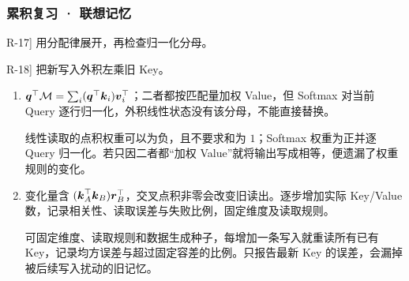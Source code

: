 \subsubsection*{累积复习 · 联想记忆}
\begin{answerhints}
\item[\hyperref[exercise:review-memory-pipeline]{R-17}] \leavevmode{}\label{hint:review-memory-pipeline}用分配律展开，再检查归一化分母。
\item[\hyperref[exercise:review-memory-correction]{R-18}] \leavevmode{}\label{hint:review-memory-correction}把新写入外积左乘旧 Key。
\end{answerhints}
\begin{enumerate}[label={},leftmargin=4.8em,itemsep=4pt]
\item[\textbf{\hyperref[exercise:review-memory-pipeline]{R-17.}}] \leavevmode{}\label{solution:R-17}\label{solution:review-memory-pipeline}$\boldsymbol{q}^\top\mathcal{M}=\sum_i(\boldsymbol{q}^\top\boldsymbol{k}_i)\boldsymbol{v}_i^\top$；二者都按匹配量加权 Value，但 Softmax 对当前 Query 逐行归一化，外积线性状态没有该分母，不能直接替换。\par 线性读取的点积权重可以为负，且不要求和为 $1$；Softmax 权重为正并逐 Query 归一化。若只因二者都“加权 Value”就将输出写成相等，便遗漏了权重规则的变化。
\item[\textbf{\hyperref[exercise:review-memory-correction]{R-18.}}] \leavevmode{}\label{solution:R-18}\label{solution:review-memory-correction}变化量含 $(\boldsymbol{k}_A^\top\boldsymbol{k}_B)\boldsymbol{r}_B^\top$，交叉点积非零会改变旧读出。逐步增加实际 Key/Value 数，记录相关性、读取误差与失败比例，固定维度及读取规则。\par 可固定维度、读取规则和数据生成种子，每增加一条写入就重读所有已有 Key，记录均方误差与超过固定容差的比例。只报告最新 Key 的误差，会漏掉被后续写入扰动的旧记忆。
\end{enumerate}
